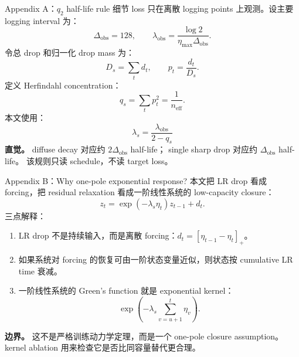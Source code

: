 \documentclass[9pt,aspectratio=169,fontset=fandol]{ctexbeamer}
\newcommand{\tightlist}{\setlength{\itemsep}{2pt}\setlength{\parskip}{0pt}}
\begin{document}
\begin{frame}{Appendix A：\(q_2\) half-life rule 细节}
\small
loss 只在离散 logging points 上观测。设主要 logging interval 为：
\[
\Delta_{\mathrm{obs}}=128,
\qquad
\lambda_{\mathrm{obs}}
=
\frac{\log 2}{\eta_{\max}\Delta_{\mathrm{obs}}}.
\]
\vfill
令总 drop 和归一化 drop mass 为：
\[
D_s=\sum_t d_t,
\qquad
p_t=\frac{d_t}{D_s}.
\]
定义 Herfindahl concentration：
\[
q_s=\sum_t p_t^2=\frac{1}{n_{\mathrm{eff}}}.
\]
本文使用：
\[
\boxed{
\lambda_s=\frac{\lambda_{\mathrm{obs}}}{2-q_s}
}
\]
\vfill
\textbf{直觉。}
diffuse decay 对应约 \(2\Delta_{\mathrm{obs}}\) half-life；
single sharp drop 对应约 \(\Delta_{\mathrm{obs}}\) half-life。
该规则只读 schedule，不读 target loss。
\end{frame}

\begin{frame}{Appendix B：Why one-pole exponential response?}
\small
本文把 LR drop 看成 forcing，把 residual relaxation 看成一阶线性系统的 low-capacity closure：
\[
z_t=\exp(-\lambda_s\eta_t)z_{t-1}+d_t.
\]
\vfill
三点解释：
\begin{enumerate}\tightlist
\item LR drop 不是持续输入，而是离散 forcing：\(d_t=[\eta_{t-1}-\eta_t]_+\)。
\item 如果系统对 forcing 的恢复可由一阶状态变量近似，则状态按 cumulative LR time 衰减。
\item 一阶线性系统的 Green's function 就是 exponential kernel：
\[
\exp\left(-\lambda_s\sum_{v=u+1}^{t}\eta_v\right).
\]
\end{enumerate}
\vfill
\textbf{边界。}
这不是严格训练动力学定理，而是一个 one-pole closure assumption。
kernel ablation 用来检查它是否比同容量替代更合理。
\end{frame}
\end{document}
